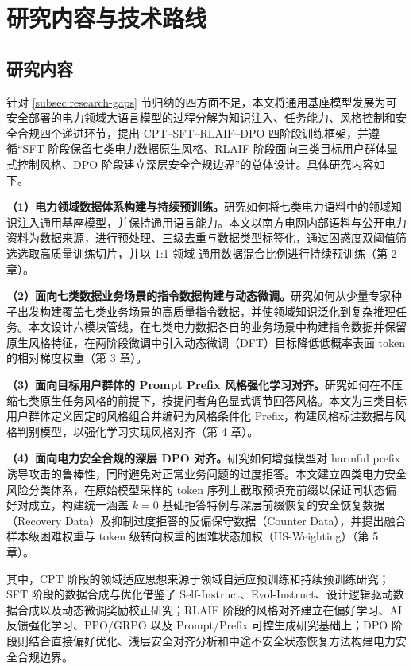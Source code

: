 \documentclass[fontset=fandol,type=master,campus=shenzhen,etitleauto=true]{hithesisbook}
\begin{document}
\section{研究内容与技术路线}\label{ux7814ux7a76ux5185ux5bb9ux4e0eux65b9ux6cd5}

\subsection{研究内容}

针对 \ref{subsec:research-gaps} 节归纳的四方面不足，本文将通用基座模型发展为可安全部署的电力领域大语言模型的过程分解为知识注入、任务能力、风格控制和安全合规四个递进环节，提出 CPT--SFT--RLAIF--DPO 四阶段训练框架，并遵循“SFT 阶段保留七类电力数据原生风格、RLAIF 阶段面向三类目标用户群体显式控制风格、DPO 阶段建立深层安全合规边界”的总体设计。具体研究内容如下。

\textbf{（1）电力领域数据体系构建与持续预训练。}研究如何将七类电力语料中的领域知识注入通用基座模型，并保持通用语言能力。本文以南方电网内部语料与公开电力资料为数据来源，进行预处理、三级去重与数据类型标签化，通过困惑度双阈值筛选选取高质量训练切片，并以 1:1 领域-通用数据混合比例进行持续预训练（第 2 章）。

\textbf{（2）面向七类数据业务场景的指令数据构建与动态微调。}研究如何从少量专家种子出发构建覆盖七类业务场景的高质量指令数据，并使领域知识泛化到复杂推理任务。本文设计六模块管线，在七类电力数据各自的业务场景中构建指令数据并保留原生风格特征，在两阶段微调中引入动态微调（DFT）目标降低低概率表面 token 的相对梯度权重（第 3 章）。

\textbf{（3）面向目标用户群体的 Prompt Prefix 风格强化学习对齐。}研究如何在不压缩七类原生任务风格的前提下，按提问者角色显式调节回答风格。本文为三类目标用户群体定义固定的风格组合并编码为风格条件化 Prefix，构建风格标注数据与风格判别模型，以强化学习实现风格对齐（第 4 章）。

\textbf{（4）面向电力安全合规的深层 DPO 对齐。}研究如何增强模型对 harmful prefix 诱导攻击的鲁棒性，同时避免对正常业务问题的过度拒答。本文建立四类电力安全风险分类体系，在原始模型采样的 token 序列上截取预填充前缀以保证同状态偏好对成立，构建统一涵盖 $k=0$ 基础拒答特例与深层前缀恢复的安全恢复数据（Recovery Data）及抑制过度拒答的反偏保守数据（Counter Data），并提出融合样本级困难权重与 token 级转向权重的困难状态加权（HS-Weighting）（第 5 章）。

其中，CPT 阶段的领域适应思想来源于领域自适应预训练和持续预训练研究\cite{ref6,ref52}；SFT 阶段的数据合成与优化借鉴了 Self-Instruct、Evol-Instruct、设计逻辑驱动数据合成以及动态微调奖励校正研究\cite{ref24,ref25,ref53,ref54,ref82}；RLAIF 阶段的风格对齐建立在偏好学习、AI 反馈强化学习、PPO/GRPO 以及 Prompt/Prefix 可控生成研究基础上\cite{ref30,ref31,ref32,ref44,ref90,ref33,ref34,ref35,ref36,ref37,ref38,ref39}；DPO 阶段则结合直接偏好优化、浅层安全对齐分析和中途不安全状态恢复方法构建电力安全合规边界\cite{ref40,ref44,ref45,ref46,ref47,ref48,ref83,ref84}。
\end{document}
